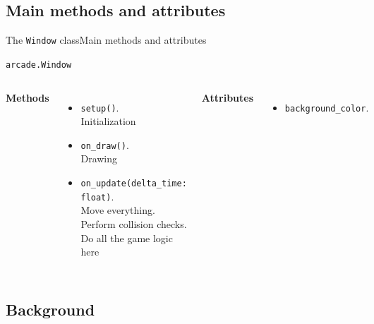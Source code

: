 \documentclass[10pt,compress]{beamer} %
\begin{document}
\subsection{Main methods and attributes}
\begin{frame}{The \texttt{Window} class}{Main methods and attributes}
	\begin{block}{\texttt{arcade.Window}}
		\smallskip
		\begin{columns}[t]
			\centering \textbf{Methods}
		\begin{itemize}
		\item \footnotesize{\texttt{setup()}}. \\Initialization
		\item \footnotesize{\texttt{on\_draw()}}. \\Drawing
		\item \footnotesize{\texttt{on\_update(delta\_time: float)}}. \\Move everything. Perform collision checks. Do all the game logic here
		\end{itemize}

		\centering \textbf{Attributes}
		\begin{itemize}
		\item \footnotesize{\texttt{background\_color}}.
		\end{itemize}
    	\end{columns}
	\end{block}	
\end{frame}

\subsection{Background}
\end{document}
